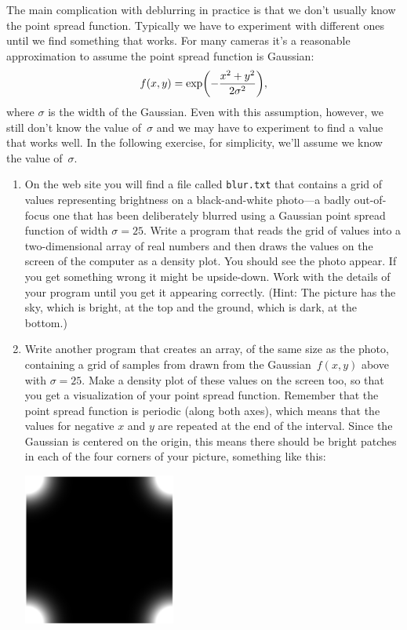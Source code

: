 \documentclass[12pt]{article}
\begin{document}
\begin{exercises}
The main complication with deblurring in practice is that we don't usually
know the point spread function.  Typically we have to experiment with
different ones until we find something that works.  For many cameras it's a
reasonable approximation to assume the point spread function is Gaussian:
\begin{displaymath}
f(x,y) = \exp\biggl( -{x^2+y^2\over2\sigma^2} \biggr),
\end{displaymath}
where $\sigma$ is the width of the Gaussian.  Even with this assumption,
however, we still don't know the value of~$\sigma$ and we may have to
experiment to find a value that works well.  In the following exercise, for
simplicity, we'll assume we know the value of~$\sigma$.

\begin{enumerate}\setlength{\itemsep}{0pt}
\item On the web site you will find a file called \verb|blur.txt| that
  contains a grid of values representing brightness on a black-and-white
  photo---a badly out-of-focus one that has been deliberately blurred using
  a Gaussian point spread function of width $\sigma=25$.  Write a program
  that reads the grid of values into a two-dimensional array of real
  numbers and then draws the values on the screen of the computer as a
  density plot.  You should see the photo appear.  If you get something
  wrong it might be upside-down.  Work with the details of your program
  until you get it appearing correctly.  (Hint: The picture has the sky,
  which is bright, at the top and the ground, which is dark, at the
  bottom.)
\item Write another program that creates an array, of the same size as the
  photo, containing a grid of samples from drawn from the Gaussian~$f(x,y)$
  above with $\sigma=25$.  Make a density plot of these values on the
  screen too, so that you get a visualization of your point spread
  function.  Remember that the point spread function is periodic (along
  both axes), which means that the values for negative $x$ and $y$ are
  repeated at the end of the interval.  Since the Gaussian is centered on
  the origin, this means there should be bright patches in each of the four
  corners of your picture, something like this:
 \medskip
\begin{center}
\includegraphics[width=5cm,clip=true]{psf.eps}
\end{center}
\smallskip


\end{enumerate}
\end{exercises}
\end{document}
